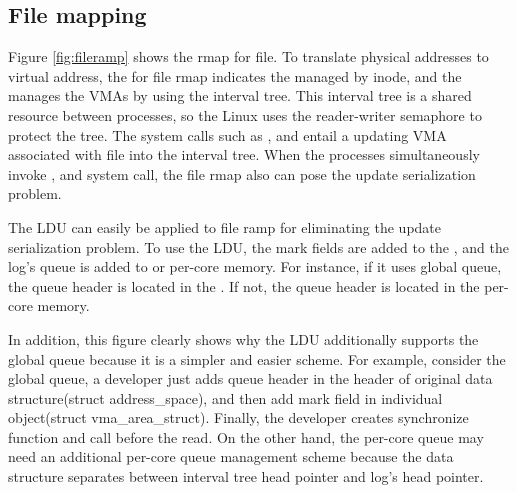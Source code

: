 \subsection{File mapping}

Figure \ref{fig:fileramp} shows the rmap for file.
To translate physical addresses to virtual address, the  for
file rmap indicates the  managed by inode, and
the  manages the VMAs by using the interval tree.
This interval tree is a shared resource between processes, so the Linux uses the
reader-writer semaphore to protect the tree.
The system calls such as ,  and  entail
a updating VMA associated with file into the interval tree.
When the processes simultaneously invoke ,  and
 system call, the file rmap also can pose the update serialization
problem.

The LDU can easily be applied to file ramp for eliminating the update
serialization problem.
To use the LDU, the mark fields are added to the , and the log's queue is added to  or per-core
memory.
For instance, if it uses global queue, the queue header is located in the
. If not, the queue header is located in the
per-core memory.

In addition, this figure clearly shows why the LDU additionally supports the
global queue because it is a simpler and easier scheme.
For example, consider the global queue, a developer just adds queue header in
the header of original data structure(struct address\_space), and then add mark
field in individual object(struct vma\_area\_struct).
Finally, the developer creates synchronize function and call before the
read.
On the other hand, the per-core queue may need an additional per-core
queue management scheme because the data structure separates between interval
tree head pointer and log's head pointer.

